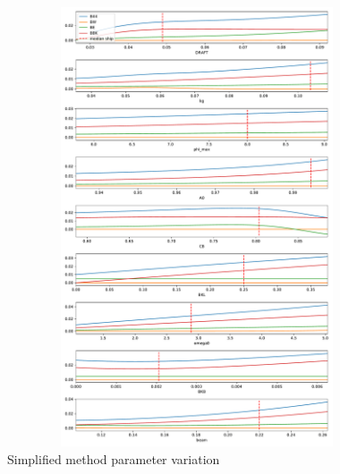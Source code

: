 \begin{figure}[H]
    \centering
    \includegraphics[height=13cm, width=15cm]{figures/ikeda_variation.pdf}
    \caption{Simplified method parameter variation}
    \label{fig:ikeda_variation}
\end{figure}







